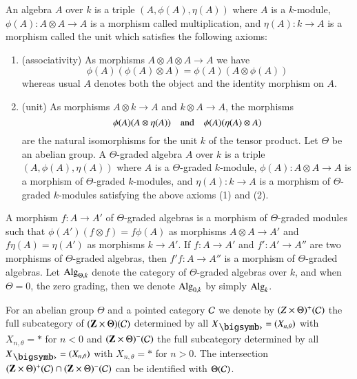 \begin{definition}\label{chap1-defi3.1}
An algebra $A$ over $k$ is a triple $(A,\phi(A),\eta(A))$ where $A$ is
a $k$-module, $\phi(A):A\otimes A\to A$ is a morphism called
multiplication, and $\eta(A):k\to A$ is a morphism called the unit
which satisfies the following axioms:
\begin{enumerate}
\renewcommand{\labelenumi}{(\theenumi)}
\item (associativity) As morphisms $A\otimes A\otimes A\to A$ we have
$$
\phi(A)(\phi(A)\otimes A)=\phi(A)(A\otimes \phi(A))
$$
where\pageoriginale as usual $A$ denotes both the object and the
identity morphism on $A$.

\item (unit) As morphisms $A\otimes k\to A$ and $k\otimes A\to A$, the
  morphisms
$$
\phi(A)(A\otimes \eta(A))\quad\text{and}\quad \phi(A)(\eta(A)\otimes A)
$$
are the natural isomorphisms for the unit $k$ of the tensor
product. Let $\Theta$ be an abelian group. A $\Theta$-graded algebra
$A$ over $k$ is a triple $(A,\phi(A),\eta(A))$ where $A$ is a
$\Theta$-graded $k$-module, $\phi(A):A\otimes A\to A$ is a morphism of
$\Theta$-graded $k$-modules, and $\eta(A):k\to A$ is a morphism of
$\Theta$-graded $k$-modules satisfying the above axioms (1) and (2).
\end{enumerate}

A morphism $f:A\to A'$ of $\Theta$-graded algebras is a
morphism of
$\Theta$-graded modules such that $\phi(A')(f\otimes f)=f\phi(A)$ as
morphisms $A\otimes A\to A'$ and $f\eta(A)=\eta(A')$ as morphisms
$k\to A'$. If $f:A\to A'$ and $f':A'\to A''$ are two morphisms of
$\Theta$-graded algebras, then $f'f:A\to A''$ is a morphism of
$\Theta$-graded algebras. Let $\operatorname{Alg}_{\Theta,k}$ denote the category of
$\Theta$-graded algebras over $k$, and when $\Theta=0$, the zero
grading, then we denote $\operatorname{Alg}_{0,k}$ by simply $\operatorname{Alg}_{k}$. 
\end{definition}

\begin{notation}\label{chap1-not3.2}
For an abelian group $\Theta$ and a pointed category $\mathcal{C}$ we denote by
$(Z\times \Theta)^{+}(\mathcal{C})$ the full subcategory of $(\mathbf{Z}\times
\Theta)(\mathcal{C})$ determined by all $X_{\bigdot}=(X_{n,\theta})$ with
$X_{n,\theta}=\ast$ for $n<0$ and $(\mathbf{Z}\times \Theta)^{-}(\mathcal{C})$ the
full subcategory determined by all $X_{\bigdot}=(X_{n,\theta})$ with
$X_{n,\theta}=\ast$ for $n>0$. The intersection $(\mathbf{Z}\times
\Theta)^{+}(\mathcal{C})\cap (\mathbf{Z}\times \Theta)^{-}(\mathcal{C})$ can be identified
with $\Theta(\mathcal{C})$.
\end{notation}

